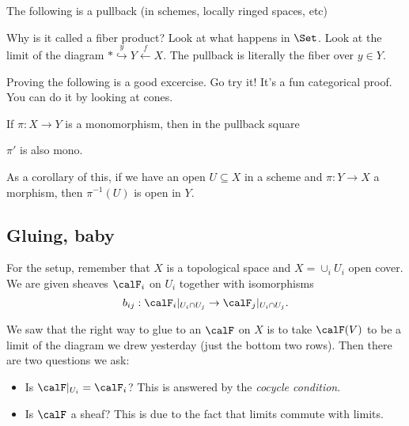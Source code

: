 \documentclass[12pt]{article}
\begin{document}
\begin{prop}
	The following is a pullback (in schemes, locally ringed spaces, etc)
	\begin{figure}[h]
		\centering
	\end{figure}
\end{prop}
\begin{rmk}
	Why is it called a fiber product? Look at what happens in $\Set$. Look at the limit of the diagram 
	$\ast\stackrel{y}{\hookrightarrow} Y \xleftarrow{f}X$. The pullback is literally the fiber over $y\in Y$.
\end{rmk}
Proving the following is a good excercise. Go try it! It's a fun categorical proof. You can do it by looking at cones. 
\newpage
\begin{lem}
	If $\pi:X\to Y$ is a monomorphism, then in the pullback square 
	\begin{figure}[h]
		\centering
	\end{figure}

	\noindent $\pi'$ is also mono.
\end{lem}
As a corollary of this, if we have an open $U\subseteq X$ in a scheme and $\pi:Y\to X$ a morphism, then 
$\pi^{-1}(U)$ is open in $Y$.

\subsection{Gluing, baby}
For the setup, remember that $X$ is a topological space and $X=\cup_i U_i$ open cover. We are given sheaves 
$\calF_i$ on $U_i$ together with isomorphisms 
\[b_{ij}:\calF_i|_{U_i\cap U_j}\to\calF_j|_{U_i\cap U_j}.\]

We saw that the right way to glue to an $\calF$ on $X$ is to take 
$\calF(V)$ to be a limit of the diagram we drew yesterday (just the bottom two rows).
Then there are two questions we ask:
\begin{itemize}
	\item Is $\calF|_{U_i}=\calF_i$? This is answered by the \textit{cocycle condition}.
	\item Is $\calF$ a sheaf? This is due to the fact that limits commute with limits.
\end{itemize}
\end{document}
